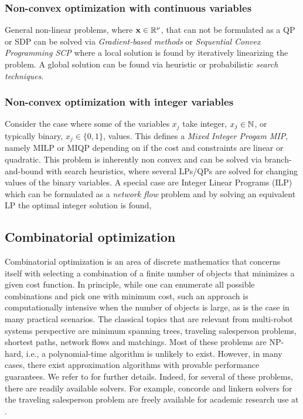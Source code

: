 \subsubsection{Non-convex optimization with continuous variables}
General non-linear problems, where $\textbf{x}\in\mathbb{R}^\nu$, that can not be formulated as a QP or SDP can be solved via \emph{Gradient-based methods} or \emph{Sequential Convex Programming SCP} where a local solution is found by iteratively linearizing the problem. A global solution can be found via heuristic or probabilistic \emph{search techniques}.  

\subsubsection{Non-convex optimization with integer variables}
Consider the case where some of the variables $x_j$ take integer, $x_j \in \mathbb{N}$, or typically binary, $x_j \in \{0,1\}$, values.
This defines a \emph{Mixed Integer Progam MIP}, namely MILP or MIQP depending on if the cost and constraints are linear or quadratic. This problem is inherently non convex and can be solved via branch-and-bound with search heuristics, where several LPs/QPs are solved for changing values of the binary variables. A special case are Integer Linear Programs (ILP) which can be formulated as a \emph{network flow} problem and by solving an equivalent LP the optimal integer solution is found,

\subsection{Combinatorial optimization}
Combinatorial optimization is an area of discrete mathematics that concerns itself with 
selecting a combination of a finite number of objects that minimizes a given cost function. In principle, while one can enumerate all possible combinations and pick one with minimum cost, such an approach is computationally intensive when the number of objects is large, as is the case in many practical scenarios. The classical topics that are relevant from multi-robot systems perspective are minimum spanning trees, traveling salesperson problems, shortest paths, network flows and matchings. Most of these problems are NP-hard, i.e., a polynomial-time algorithm is unlikely to exist. However, in many cases, there exist approximation algorithms with provable performance guarantees. We refer to \cite{Korte.Vygen:02} for further details. Indeed, for several of these problems, there are readily available solvers. For example, {\ttfamily concorde} and {\ttfamily linkern} solvers for the traveling salesperson problem are
  freely available for academic research use at \cite{tsp-url}.

